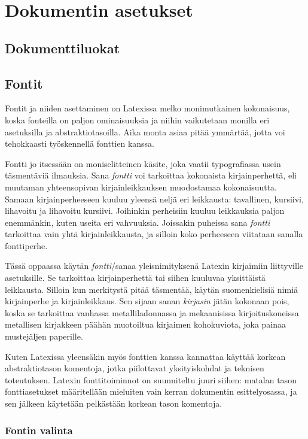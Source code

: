 \chapter{Dokumentin asetukset}
\section{Dokumenttiluokat}
\label{luku:dokumenttiluokat}
\section{Fontit}
\label{luku:kirjaintyypit}

Fontit ja niiden asettaminen on Latexissa melko monimutkainen
kokonaisuus, koska fonteilla on paljon ominaisuuksia ja niihin
vaikutetaan monilla eri asetuksilla ja abstraktiotasoilla. Aika monta
asiaa pitää ymmärtää, jotta voi tehokkaasti työskennellä fonttien
kanssa.

Fontti jo itsessään on moniselitteinen käsite, joka vaatii typografiassa
usein täsmentäviä ilmauksia. Sana \emph{fontti} voi tarkoittaa
kokonaista kirjainperhettä, eli muutaman yhteensopivan
kirjainleikkauksen muodostamaa kokonaisuutta. Samaan kirjainperheeseen
kuuluu yleensä neljä eri leikkausta: tavallinen, kursiivi, lihavoitu ja
lihavoitu kursiivi. Joihinkin perheisiin kuuluu leikkauksia paljon
enemmänkin, kuten useita eri vahvuuksia. Joissakin puheissa sana
\emph{fontti} tarkoittaa vain yhtä kirjainleikkausta, ja silloin koko
perheeseen viitataan sanalla fonttiperhe.

Tässä oppaassa käytän \emph{fontti}\-/sanaa yleisnimityksenä Latexin
kirjaimiin liittyville asetuksille. Se tarkoittaa kirjainperhettä tai
siihen kuuluvaa yksittäistä leikkausta. Silloin kun merkitystä pitää
täsmentää, käytän suomenkielisiä nimiä kirjainperhe ja kirjainleikkaus.
Sen sijaan sanan \emph{kirjasin} jätän kokonaan pois, koska se
tarkoittaa vanhassa metalliladonnassa ja mekaanisissa kirjoituskoneissa
metallisen kirjakkeen päähän muotoiltua kirjaimen kohokuviota, joka
painaa mustejäljen paperille.

Kuten Latexissa yleensäkin myös fonttien kanssa kannattaa käyttää
korkean abstraktiotason komentoja, jotka piilottavat yksityiskohdat ja
teknisen toteutuksen. Latexin fonttitoiminnot on suunniteltu juuri
siihen: matalan tason fontti\-asetukset määritellään mieluiten vain
kerran dokumentin esittely\-osassa, ja sen jälkeen käytetään pelkästään
korkean tason komentoja.

\subsection{Fontin valinta}

